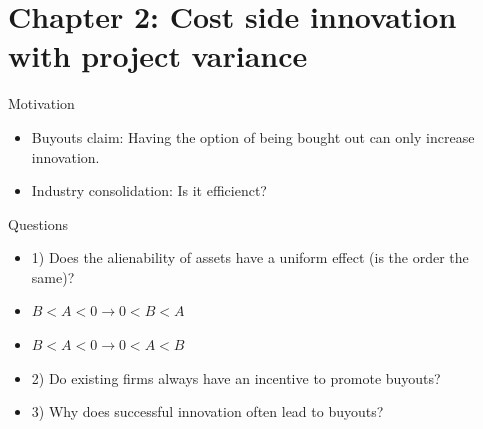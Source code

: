 \documentclass{beamer}
\numberwithin{equation}{section}
\begin{document}
\section{Chapter 2: Cost side innovation with project variance}
\begin{frame}{Motivation}
\begin{itemize}
    \item Buyouts claim: Having the option of being bought out can only increase innovation. 
    \item Industry consolidation: Is it efficienct?
\end{itemize}
\end{frame}
\begin{frame}{Questions}
\begin{itemize}
    \item 1) Does the alienability of assets have a uniform effect (is the order the same)?
    \item $B<A<0 \rightarrow 0<B<A $
    \item $B<A<0 \rightarrow 0<A<B $  
    \item 2) Do existing firms always have an incentive to promote buyouts?
    \item 3) Why does successful innovation often lead to buyouts?
\end{itemize}
\end{frame}
\end{document}
